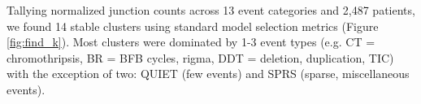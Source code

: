 \documentclass[phd,tocprelim]{cornell}
\renewcommand{\caption}[1]{\singlespacing\hangcaption{#1}\normalspacing}
\begin{document}


Tallying normalized junction counts across 13 event categories and 2,487 patients, we found 14 stable clusters using standard model selection metrics (Figure \ref{fig:find_k}). Most clusters were dominated by 1-3 event types (e.g. CT = chromothripsis, BR = BFB cycles, rigma, DDT = deletion, duplication, TIC) with the exception of two: QUIET (few events) and SPRS (sparse, miscellaneous events).

\begin{figure}[!ht]
\end{figure}
\end{document}
